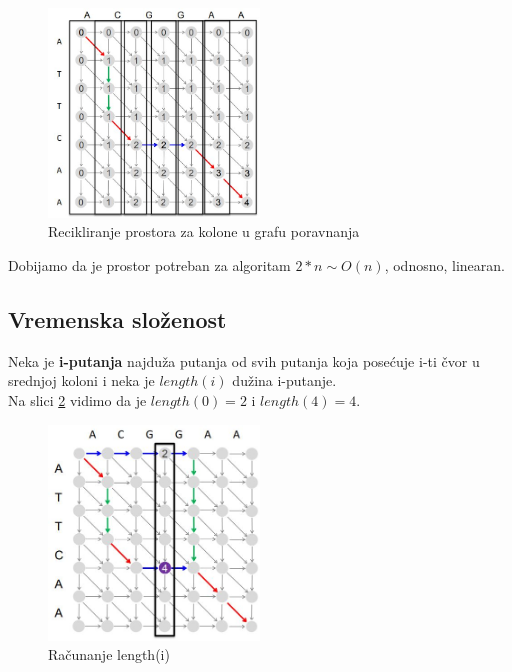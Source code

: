 \begin{figure}[h!]
\centering
\includegraphics[width=0.5\textwidth]{poglavlja/5/slike/prostornaSlozenost2.JPG}
\caption{Recikliranje prostora za kolone u grafu poravnanja}
\label{slika:prostornaSlozenost}
\end{figure}

Dobijamo da je prostor potreban za algoritam $2*n \sim O(n)$, odnosno, linearan. \\ 

\subsection{Vremenska složenost}

Neka je \textbf{i-putanja} najduža putanja od svih putanja koja posećuje i-ti čvor u srednjoj koloni i neka je \textbf{$length(i)$} dužina i-putanje.\\

Na slici \ref{slika:iputanja} vidimo da je $length(0)=2$ i $length(4)=4$. \\


\begin{figure}[h!]
\centering
\includegraphics[width=0.5\textwidth]{poglavlja/5/slike/i_putanje.JPG}
\caption{Računanje length(i)}
\label{slika:iputanja}
\end{figure}


